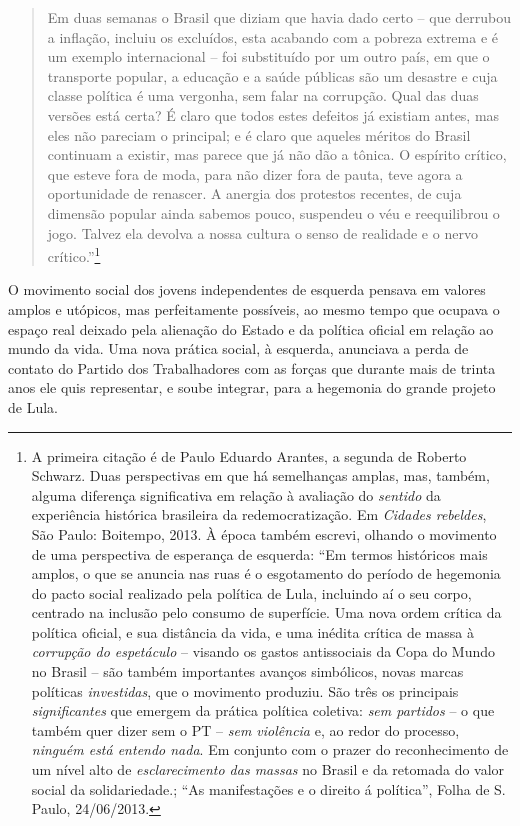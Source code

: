 \begin{quote}
Em duas semanas o Brasil que diziam que havia dado certo -- que
derrubou a inflação, incluiu os excluídos, esta acabando com a pobreza
extrema e é um exemplo internacional -- foi substituído por um outro
país, em que o transporte popular, a educação e a saúde públicas são um
desastre e cuja classe política é uma vergonha, sem falar na corrupção.
Qual das duas versões está certa? É claro que todos estes defeitos já
existiam antes, mas eles não pareciam o principal; e é claro que aqueles
méritos do Brasil continuam a existir, mas parece que já não dão a
tônica. O espírito crítico, que esteve fora de moda, para não dizer fora
de pauta, teve agora a oportunidade de renascer. A anergia dos protestos
recentes, de cuja dimensão popular ainda sabemos pouco, suspendeu o véu
e reequilibrou o jogo. Talvez ela devolva a nossa cultura o senso de
realidade e o nervo crítico.''\footnote{A primeira citação é de Paulo
  Eduardo Arantes, a segunda de Roberto Schwarz. Duas perspectivas em
  que há semelhanças amplas, mas, também, alguma diferença significativa
  em relação à avaliação do \emph{sentido} da experiência histórica
  brasileira da redemocratização. Em \emph{Cidades rebeldes}, São Paulo:
  Boitempo, 2013. À época também escrevi, olhando o movimento de uma
  perspectiva de esperança de esquerda: ``Em termos históricos mais
  amplos, o que se anuncia nas ruas é o esgotamento do período de
  hegemonia do pacto social realizado pela política de Lula, incluindo
  aí o seu corpo, centrado na inclusão pelo consumo de superfície. Uma
  nova ordem crítica da política oficial, e sua distância da vida, e uma
  inédita crítica de massa à \emph{corrupção do espetáculo} -- visando
  os gastos antissociais da Copa do Mundo no Brasil -- são também
  importantes avanços simbólicos, novas marcas políticas
  \emph{investidas}, que o movimento produziu. São três os principais
  \emph{significantes} que emergem da prática política coletiva:
  \emph{sem partidos} -- o que também quer dizer sem o PT -- \emph{sem
  violência} e, ao redor do processo, \emph{ninguém está entendo nada}.
  Em conjunto com o prazer do reconhecimento de um nível alto de
  \emph{esclarecimento das massas} no Brasil e da retomada do valor
  social da solidariedade.; ``As manifestações e o direito á
  política'', Folha de S. Paulo, 24/06/2013.}
\end{quote} 


O movimento social dos jovens independentes de esquerda pensava em
valores amplos e utópicos, mas perfeitamente possíveis, ao mesmo tempo
que ocupava o espaço real deixado pela alienação do Estado e da política
oficial em relação ao mundo da vida. Uma nova prática social, à
esquerda, anunciava a perda de contato do Partido dos Trabalhadores com
as forças que durante mais de trinta anos ele quis representar, e soube
integrar, para a hegemonia do grande projeto de Lula.

